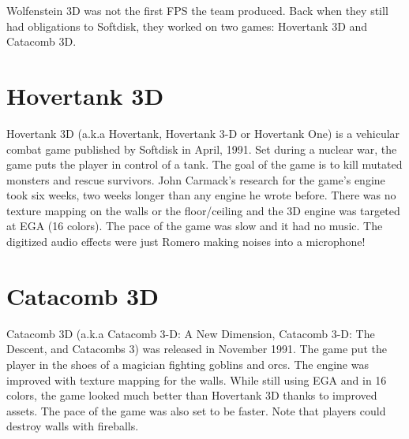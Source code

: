 Wolfenstein 3D was not the first FPS the team produced. Back when they still had obligations to Softdisk, they worked on two games: Hovertank 3D and Catacomb 3D.\\
\par
\section{Hovertank 3D}
Hovertank 3D (a.k.a Hovertank, Hovertank 3-D or Hovertank One) is a vehicular combat game published by Softdisk in April, 1991. Set during a nuclear war, the game puts the player in control of a tank. The goal of the game is to kill mutated monsters and rescue survivors. John Carmack's research for the game's engine took six weeks, two weeks longer than any engine he wrote before. There was no texture mapping on the walls or the floor/ceiling and the 3D engine was targeted at EGA (16 colors). The pace of the game was slow and it had no music. The digitized audio effects were just Romero making noises into a microphone! \\
\par

\section{Catacomb 3D}
Catacomb 3D (a.k.a Catacomb 3-D: A New Dimension, Catacomb 3-D: The Descent, and Catacombs 3) was released in November 1991. The game put the player in the shoes of a magician fighting goblins and orcs. The engine was improved with texture mapping for the walls. While still using EGA and in 16 colors, the game looked much better than Hovertank 3D thanks to improved assets. The pace of the game was also set to be faster. Note that players could destroy walls with fireballs.\\
\par
\begin{minipage}{\textwidth}
\label{hovertank3d_screenshot}
\begin{figure}[H]
\centering
{}
\end{figure}

\begin{figure}[H]
\centering
{}
\end{figure}
\end{minipage}


\begin{minipage}{\textwidth}
\label{catacomb3d_screenshot}
\begin{figure}[H]
\centering
{}
\end{figure}

\begin{figure}[H]
\centering
{}
\end{figure}
\end{minipage}

